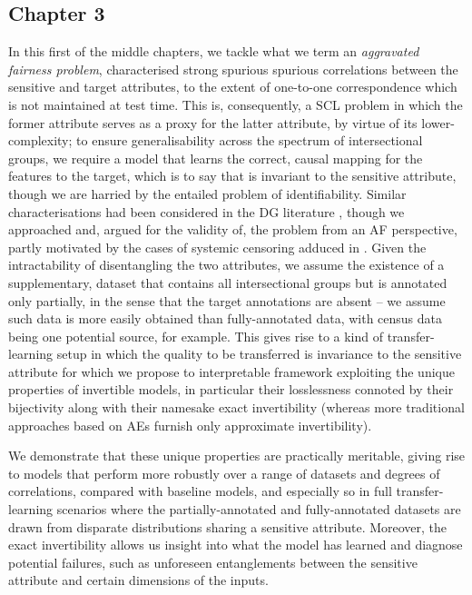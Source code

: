 \subsection*{Chapter 3}%
%
In this first of the middle chapters, we tackle what we term an \emph{aggravated fairness problem},
characterised strong spurious spurious correlations between the sensitive and target attributes, to
the extent of one-to-one correspondence which is not maintained at test time.
%
This is, consequently, a \acf{SCL} problem in which the former attribute serves as a proxy
for the latter attribute, by virtue of its lower-complexity; to ensure generalisability across the
spectrum of intersectional groups, we require a model that learns the correct, causal mapping for
the features to the target, which is to say that is invariant to the sensitive attribute, though we
are harried by the entailed problem of identifiability.
%
Similar characterisations had been considered in the \ac{DG} literature
\citep{arjovsky2019invariant, jacobsen2019excessive}, though we approached and, argued for the
validity of, the problem from an \ac{AF} perspective, partly motivated by the cases of systemic
censoring adduced in \citet{kallus2018residual}.
%
Given the intractability of disentangling the two attributes, we assume the existence of a
supplementary, dataset that contains all intersectional groups but is annotated only partially, in
the sense that the target annotations are absent -- we assume such data is more easily obtained
than fully-annotated data, with census data being one potential source, for example.
%
This gives rise to a kind of transfer-learning setup in which the quality to be transferred is
invariance to the sensitive attribute for which we propose to interpretable framework exploiting
the unique properties of invertible models, in particular their losslessness connoted by their
bijectivity along with their namesake exact invertibility (whereas more traditional approaches
based on \acp{AE} furnish only approximate invertibility).
%

We demonstrate that these unique properties are practically meritable, giving rise to models that
perform more robustly over a range of datasets and degrees of correlations, compared with baseline
models, and especially so in full transfer-learning scenarios where the partially-annotated and
fully-annotated datasets are drawn from disparate distributions sharing a sensitive attribute.
%
Moreover, the exact invertibility allows us insight into what the model has learned and diagnose
potential failures, such as unforeseen entanglements between the sensitive attribute and certain
dimensions of the inputs.
%
